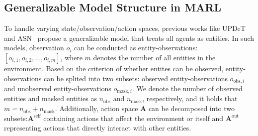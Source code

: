 \subsection{Generalizable Model Structure in MARL}
To handle varying state/observation/action spaces, previous works like UPDeT~\cite{hu2021updet} and ASN~\cite{wang2019action} propose a generalizable model that treats all agents as entities. In such models, observation $o_i$ can be conducted as entity-observations: $[o_{i,1},o_{i,2},...,o_{i,m}]$, where $m$ denotes the number of all entities in the environment. Based on the criterion of whether entites can be observed, entity-observations can be splited into two subsets: observed entity-observations $o_{\mathrm{obs},i}$ and unobserved entity-observations $o_{\mathrm{mask},i}$. We denote the number of observed entities and masked entities as $n_{\mathrm{obs}}$ and $n_{\mathrm{mask}}$, respectively, and it holds that $m=n_{\mathrm{obs}}+n_{\mathrm{mask}}$.
Additionally, action space $\boldsymbol{A}$ can be decomposed into two subsets:$\boldsymbol{A}^{\mathrm{self}}$ containing actions that affect the environment or itself  and $\boldsymbol{A}^{\mathrm{out}}$ representing actions that directly interact with other entities.